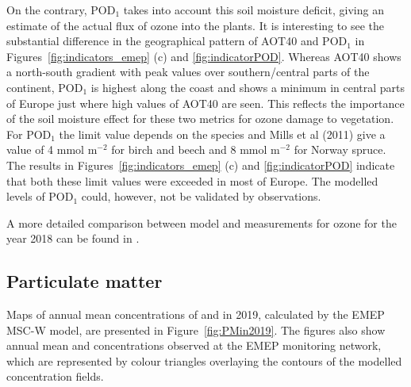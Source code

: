 On the contrary, POD$_1$ takes into account this soil moisture deficit, giving an estimate of the actual flux of ozone into the plants. It is interesting to see the substantial difference in the geographical pattern of AOT40 and POD$_1$ in Figures~\ref{fig:indicators_emep} (c) and \ref{fig:indicatorPOD}. Whereas AOT40 shows a north-south gradient with peak values over southern/central parts of the continent, POD$_1$ is highest along the coast and shows a minimum in central parts of Europe just where high values of AOT40 are seen. This reflects the importance of the soil moisture effect for these two metrics for ozone damage to vegetation. For POD$_1$ the limit value depends on the species and Mills et al (2011) give a value of 4 mmol m$^{-2}$ for birch and beech and 8 mmol m$^{-2}$ for Norway spruce. The results in Figures~\ref{fig:indicators_emep} (c) and \ref{fig:indicatorPOD} indicate that both these limit values were exceeded in most of Europe. The modelled levels of POD$_1$ could, however, not be validated by observations. 

A more detailed comparison between model and measurements for ozone for the year 2018 can be found in \cite{WEB2020:O3}.



\subsection{Particulate matter} 
\label{subs:PMstatus}

Maps of annual mean concentrations of \PM[10] and \PM[2.5] in 2019,
calculated by the EMEP MSC-W model, are presented in
Figure~\ref{fig:PMin2019}. The figures also show annual mean \PM[10]
and \PM[2.5] concentrations observed at the EMEP monitoring network,
which are represented by colour triangles overlaying the contours of the
modelled concentration fields.

